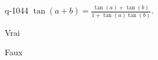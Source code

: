 \begin{truefalse}{q-1044}
$\tan(a+b)=\frac{\tan(a) + \tan(b)}{1+\tan(a)\tan(b)}$.
\item Vrai
\item* Faux
\end{truefalse}

